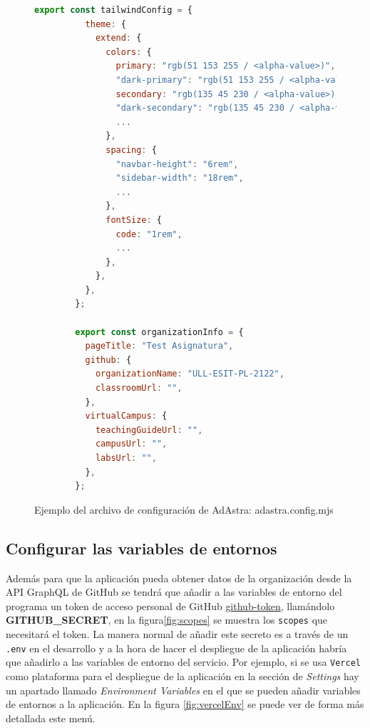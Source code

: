 \begin{figure}
  \begin{lstlisting}[language=Javascript]
        export const tailwindConfig = {
          theme: {
            extend: {
              colors: {
                primary: "rgb(51 153 255 / <alpha-value>)",
                "dark-primary": "rgb(51 153 255 / <alpha-value>)",
                secondary: "rgb(135 45 230 / <alpha-value>)",
                "dark-secondary": "rgb(135 45 230 / <alpha-value>)",
                ...
              },
              spacing: {
                "navbar-height": "6rem",
                "sidebar-width": "18rem",
                ...
              },
              fontSize: {
                code: "1rem",
                ...
              },
            },
          },
        };
        
        export const organizationInfo = {
          pageTitle: "Test Asignatura",
          github: {
            organizationName: "ULL-ESIT-PL-2122",
            classroomUrl: "",
          },
          virtualCampus: {
            teachingGuideUrl: "",
            campusUrl: "",
            labsUrl: "",
          },
        };
    \end{lstlisting}
    \caption{Ejemplo del archivo de configuración de AdAstra: adastra.config.mjs}
    \label{fig:adastraConfig}
\end{figure}

\subsection{Configurar las variables de entornos}

Además para que la aplicación pueda obtener datos de la organización desde la API GraphQL de GitHub se tendrá que añadir a las variables de entorno del programa un token de acceso personal de GitHub \url{github-token}, llamándolo \textbf{GITHUB\_SECRET}, en la figura\ref{fig:scopes} se muestra los \verb|scopes| que necesitará el token. La manera normal de añadir este secreto es a través de un \verb|.env| en el desarrollo y a la hora de hacer el despliegue de la aplicación habría que añadirlo a las variables de entorno del servicio. Por ejemplo, si se usa \verb|Vercel| \cite{vercel} como plataforma para el despliegue de la aplicación en la sección de \textit{Settings} hay un apartado llamado 
\textit{Environment Variables} en el que se pueden añadir variables de entornos a la aplicación. En la figura \ref{fig:vercelEnv} se puede ver de forma más detallada este menú.

